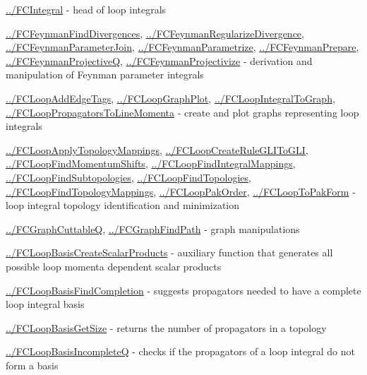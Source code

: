 \documentclass[../FeynCalcManual.tex]{subfiles}
\begin{document}
\begin{itemize}
{  \hyperlink{../fcintegral}{../FCIntegral} - head of loop integrals
\item
  \hyperlink{../fcfeynmanfinddivergences}{../FCFeynmanFindDivergences},
  \hyperlink{../fcfeynmanregularizedivergence}{../FCFeynmanRegularizeDivergence},
  \hyperlink{../fcfeynmanparameterjoin}{../FCFeynmanParameterJoin},
  \hyperlink{../fcfeynmanparametrize}{../FCFeynmanParametrize},
  \hyperlink{../fcfeynmanprepare}{../FCFeynmanPrepare},
  \hyperlink{../fcfeynmanprojectiveq}{../FCFeynmanProjectiveQ},
  \hyperlink{../fcfeynmanprojectivize}{../FCFeynmanProjectivize} -
  derivation and manipulation of Feynman parameter integrals
\item
  \hyperlink{../fcloopaddedgetags}{../FCLoopAddEdgeTags},
  \hyperlink{../fcloopgraphplot}{../FCLoopGraphPlot},
  \hyperlink{../fcloopintegraltograph}{../FCLoopIntegralToGraph},
  \hyperlink{../fclooppropagatorstolinemomenta}{../FCLoopPropagatorsToLineMomenta}
  - create and plot graphs representing loop integrals
\item
  \hyperlink{../fcloopapplytopologymappings}{../FCLoopApplyTopologyMappings},
  \hyperlink{../fcloopcreateruleglitogli}{../FCLoopCreateRuleGLIToGLI},
  \hyperlink{../fcloopfindmomentumshifts}{../FCLoopFindMomentumShifts},
  \hyperlink{../fcloopfindintegralmappings}{../FCLoopFindIntegralMappings},
  \hyperlink{../fcloopfindsubtopologies}{../FCLoopFindSubtopologies},
  \hyperlink{../fcloopfindtopologies}{../FCLoopFindTopologies},
  \hyperlink{../fcloopfindtopologymappings}{../FCLoopFindTopologyMappings},
  \hyperlink{../fclooppakorder}{../FCLoopPakOrder},
  \hyperlink{../fclooptopakform}{../FCLoopToPakForm} - loop integral
  topology identification and minimization
\item
  \hyperlink{../fcgraphcuttableq}{../FCGraphCuttableQ},
  \hyperlink{../fcgraphfindpath}{../FCGraphFindPath} - graph
  manipulations
\item
  \hyperlink{../fcloopbasiscreatescalarproducts}{../FCLoopBasisCreateScalarProducts}
  - auxiliary function that generates all possible loop momenta
  dependent scalar products
\item
  \hyperlink{../fcloopbasisfindcompletion}{../FCLoopBasisFindCompletion}
  - suggests propagators needed to have a complete loop integral basis
\item
  \hyperlink{../fcloopbasisgetsize}{../FCLoopBasisGetSize} - returns the
  number of propagators in a topology
\item
  \hyperlink{../fcloopbasisincompleteq}{../FCLoopBasisIncompleteQ} -
  checks if the propagators of a loop integral do not form a basis
}
\end{itemize}
\end{document}
